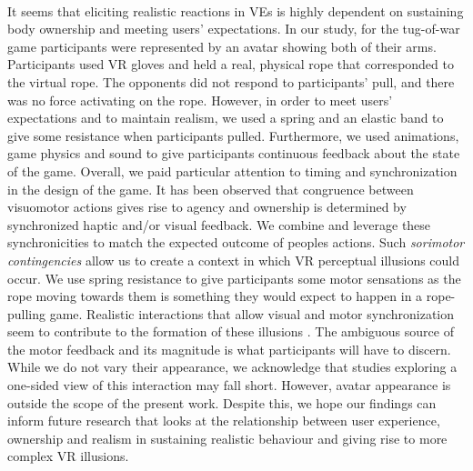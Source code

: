 \\
It seems that eliciting realistic reactions in VEs is highly dependent on sustaining body ownership and meeting users' expectations. In our study, for the tug-of-war game participants were represented by an avatar showing both of their arms. Participants used VR gloves and held a real, physical rope that corresponded to the virtual rope. The opponents did not respond to participants' pull, and there was no force activating on the rope. However, in order to meet users' expectations and to maintain realism, we used a spring and an elastic band to give some resistance when participants pulled. Furthermore, we used animations, game physics and sound to give participants continuous feedback about the state of the game. Overall, we paid particular attention to timing and synchronization in the design of the game. It has been observed that congruence between visuomotor actions gives rise to agency  \cite{kilteni2012sense} and ownership is determined by synchronized haptic and/or visual feedback. We combine and leverage these synchronicities to match the expected outcome of peoples actions. Such \textit{sorimotor contingencies} \cite{slater2009place} allow us to create a context in which VR perceptual illusions could occur. We use spring resistance to give participants some motor sensations as the rope moving towards them is something they would expect to happen in a rope-pulling game. Realistic interactions that allow visual and motor synchronization seem to contribute to the formation of these illusions \cite{slater2009place}. The ambiguous source of the motor feedback and its magnitude is what participants will have to discern. While we do not vary their appearance, we acknowledge that studies exploring a one-sided view of this interaction may fall short. However, avatar appearance is outside the scope of the present work. Despite this, we hope our findings can inform future research that looks at the relationship between user experience, ownership and realism in sustaining realistic behaviour and giving rise to more complex VR illusions.
